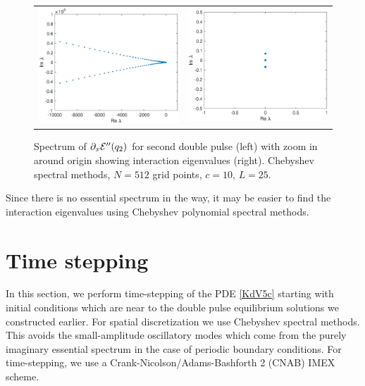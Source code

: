 \documentclass[thesis.tex]{subfiles}
\begin{document}
\begin{figure}
\begin{center}
\begin{tabular}{cc}
\includegraphics[width=6cm]{images/kdv5numerics/double2speccheb} &
\includegraphics[width=6cm]{images/kdv5numerics/double2specchebzoom.eps} \\
\end{tabular}
\caption{Spectrum of $\partial_x \mathcal{E}''(q_2)$ for second double pulse (left) with zoom in around origin showing interaction eigenvalues (right). Chebyshev spectral methods, $N = 512$ grid points, $c = 10$, $L = 25$.}
\label{fig:KdV5speccheb}
\end{center}
\end{figure}

Since there is no essential spectrum in the way, it may be easier to find the interaction eigenvalues using Chebyshev polynomial spectral methods.

\section{Time stepping}

In this section, we perform time-stepping of the PDE \eqref{KdV5c} starting with initial conditions which are near to the double pulse equilibrium solutions we constructed earlier. For spatial discretization we use Chebyshev spectral methods. This avoids the small-amplitude oscillatory modes which come from the purely imaginary essential spectrum in the case of periodic boundary conditions. For time-stepping, we use a Crank-Nicolson/Adams-Bashforth 2 (CNAB) IMEX scheme.
\end{document}
